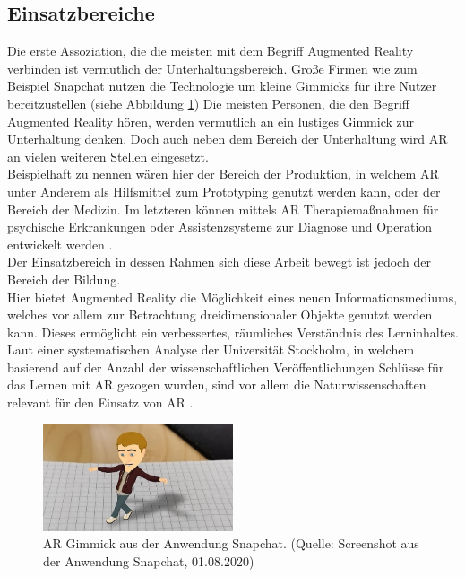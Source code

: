 \subsection{Einsatzbereiche}
Die erste Assoziation, die die meisten mit dem Begriff Augmented Reality verbinden ist vermutlich der Unterhaltungsbereich. Große Firmen wie zum Beispiel Snapchat nutzen die Technologie um kleine Gimmicks für ihre Nutzer bereitzustellen (siehe Abbildung \ref{fig:snapchat-ar})
Die meisten Personen, die den Begriff Augmented Reality hören, werden vermutlich an ein lustiges Gimmick zur Unterhaltung denken. Doch auch neben dem Bereich der Unterhaltung wird AR an vielen weiteren Stellen eingesetzt.\\
Beispielhaft zu nennen wären hier der Bereich der Produktion, in welchem AR unter Anderem als Hilfsmittel zum Prototyping \citep[S. 44]{tab:augmented-reality} genutzt werden kann, oder der Bereich der Medizin. Im letzteren können mittels AR Therapiemaßnahmen für psychische Erkrankungen oder Assistenzsysteme zur Diagnose und Operation entwickelt werden \citep[S. 52, 54]{tab:augmented-reality}.\\
Der Einsatzbereich in dessen Rahmen sich diese Arbeit bewegt ist jedoch der Bereich der Bildung.\\
Hier bietet Augmented Reality die Möglichkeit eines neuen Informationsmediums, welches vor allem zur Betrachtung dreidimensionaler Objekte genutzt werden kann. Dieses ermöglicht ein verbessertes, räumliches Verständnis des Lerninhaltes. 
Laut einer systematischen Analyse der Universität Stockholm, in welchem basierend auf der Anzahl der wissenschaftlichen Veröffentlichungen Schlüsse für das Lernen mit AR gezogen wurden, sind vor allem die Naturwissenschaften relevant für den Einsatz von AR  \citep[S. 81]{hedberg:review-ar-learning}. 

\begin{figure}[h!]
\centering
\includegraphics[width=0.5\textwidth]{Abbildungen/Snapchat-AR.jpg}
\caption[Snapchat AR]{AR Gimmick aus der Anwendung Snapchat. (Quelle: Screenshot aus der Anwendung Snapchat, 01.08.2020)}
\label{fig:snapchat-ar}
\end{figure}

